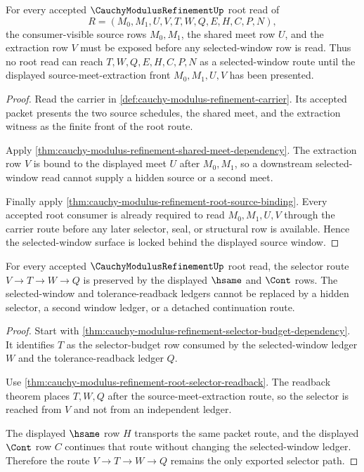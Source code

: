 \begin{theorem}
\label{thm:cauchy-modulus-refinement-source-window-lock}
For every accepted $\CauchyModulusRefinementUp$ root read of
$$
R=(M_0,M_1,U,V,T,W,Q,E,H,C,P,N),
$$
the consumer-visible source rows $M_0,M_1$, the shared meet row $U$, and the extraction row $V$ must be exposed before any selected-window row is read. Thus no root read can reach $T,W,Q,E,H,C,P,N$ as a selected-window route until the displayed source-meet-extraction front $M_0,M_1,U,V$ has been presented.
\end{theorem}
\begin{proof}
Read the carrier in \autoref{def:cauchy-modulus-refinement-carrier}. Its accepted packet presents the two source schedules, the shared meet, and the extraction witness as the finite front of the root route.

Apply \autoref{thm:cauchy-modulus-refinement-shared-meet-dependency}. The extraction row $V$ is bound to the displayed meet $U$ after $M_0,M_1$, so a downstream selected-window read cannot supply a hidden source or a second meet.

Finally apply \autoref{thm:cauchy-modulus-refinement-root-source-binding}. Every accepted root consumer is already required to read $M_0,M_1,U,V$ through the carrier route before any later selector, seal, or structural row is available. Hence the selected-window surface is locked behind the displayed source window.
\end{proof}

\begin{theorem}
\label{thm:cauchy-modulus-refinement-selector-stability-lock}
For every accepted $\CauchyModulusRefinementUp$ root read, the selector route $V \to T \to W \to Q$ is preserved by the displayed $\hsame$ and $\Cont$ rows. The selected-window and tolerance-readback ledgers cannot be replaced by a hidden selector, a second window ledger, or a detached continuation route.
\end{theorem}
\begin{proof}
Start with \autoref{thm:cauchy-modulus-refinement-selector-budget-dependency}. It identifies $T$ as the selector-budget row consumed by the selected-window ledger $W$ and the tolerance-readback ledger $Q$.

Use \autoref{thm:cauchy-modulus-refinement-root-selector-readback}. The readback theorem places $T,W,Q$ after the source-meet-extraction route, so the selector is reached from $V$ and not from an independent ledger.

The displayed $\hsame$ row $H$ transports the same packet route, and the displayed $\Cont$ row $C$ continues that route without changing the selected-window ledger. Therefore the route $V \to T \to W \to Q$ remains the only exported selector path.
\end{proof}

